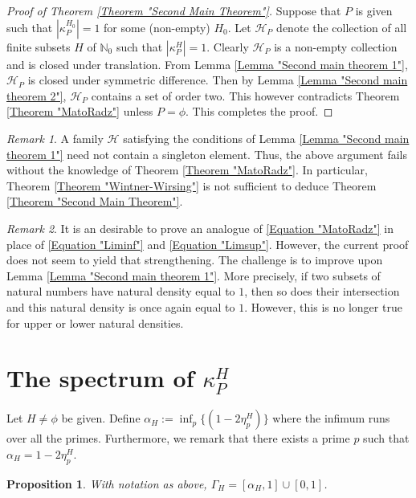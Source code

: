 \documentclass[12pt, a4paper]{amsart}
\newtheorem{proposition}{Proposition}
\theoremstyle{remark}
\newtheorem{remark}{Remark}
\theoremstyle{proof}
\numberwithin{equation}{section}
\numberwithin{assumption}{section}
\newcommand{\N}{\mathbb{N}}
\newcommand{\h}{\mathcal{H}}
\begin{document}
	\begin{proof}[Proof of Theorem \ref{Theorem "Second Main Theorem"}]
		Suppose that $P$ is given such that $|\kappa_{P}^{H_0}|=1$ for some (non-empty) $H_0$. Let $\h_P$ denote the collection of all finite subsets $H$ of $\N_0$ such that $|\kappa_P^H|=1$. Clearly $\h_P$ is a non-empty collection and is closed under translation.  From Lemma \ref{Lemma "Second main theorem 1"}, $\h_P$ is closed under symmetric difference. Then by Lemma \ref{Lemma "Second main theorem 2"}, $\h_P$ contains a set of order two. This however contradicts Theorem \ref{Theorem "MatoRadz"} unless $P=\phi$. This completes the proof.
	\end{proof}
	
	\begin{remark}\label{Remark "2 set"}
		A family $\h$ satisfying the conditions of Lemma \ref{Lemma "Second main theorem 1"} need not contain a singleton element. Thus, the above argument fails without the knowledge of Theorem \ref{Theorem "MatoRadz"}. In particular, Theorem \ref{Theorem "Wintner-Wirsing"} is not sufficient to deduce Theorem \ref{Theorem "Second Main Theorem"}.
	\end{remark}
	
	\begin{remark}
		It is an desirable to prove an analogue of \eqref{Equation "MatoRadz"} in place of \eqref{Equation "Liminf"} and \eqref{Equation "Limsup"}. However, the current proof does not seem to yield that strengthening. The challenge is to improve upon Lemma \ref{Lemma "Second main theorem 1"}. More precisely, if two subsets of natural numbers have natural density equal to $1$, then so does their intersection and this natural density is once again equal to $1$. However, this is no longer true for upper or lower natural densities.
	\end{remark}

	\section{The spectrum of $\kappa_P^H$}\label{Section "Spectrum"}
	
	Let $H\neq \phi$ be given. Define $\alpha_H:=\inf_{p}\{(1-2\eta_p^H)\}$ where the infimum runs over all the primes. Furthermore, we remark that there exists a prime $p$ such that $\alpha_H = 1-2\eta_p^H$.
	
	\begin{proposition}\label{Proposition "Spectrum"}
		With notation as above, $\Gamma_H = [\alpha_H,1] \cup [0,1]$.
	\end{proposition}
	
\end{document}
